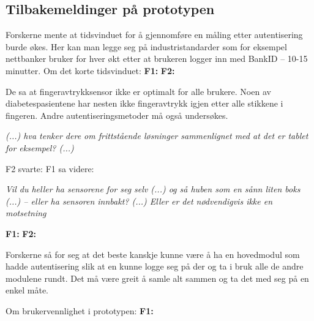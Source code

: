 \subsection{Tilbakemeldinger på prototypen}
Forskerne mente at tidsvinduet for å gjennomføre en måling etter autentisering burde økes. Her kan man legge seg på industristandarder
som for eksempel nettbanker bruker for hver økt etter at brukeren logger inn med BankID -- 10-15 minutter.
Om det korte tidsvinduet: \newline
\textbf{F1:}  \newline
\textbf{F2:} 

De sa at fingeravtrykksensor ikke er optimalt for alle brukere. Noen av diabetespasientene har nesten ikke fingeravtrykk igjen etter alle stikkene
i fingeren. Andre autentiseringsmetoder må også undersøkes.

\textit{(...) hva tenker dere om frittstående løsninger sammenlignet med at det er tablet for eksempel? (...)}

F2 svarte: 
F1 sa videre: 

\textit{Vil du heller ha sensorene for seg selv (...) og så huben som en sånn liten boks (...)  -- eller ha sensoren innbakt? (...)  Eller er det
nødvendigvis ikke en motsetning}

\textbf{F1:}  \newline
\textbf{F2:} 

Forskerne så for seg at det beste kanskje kunne være å ha en hovedmodul som hadde autentisering slik at en kunne logge seg på der
og ta i bruk alle de andre modulene rundt. Det må være greit å samle alt sammen og ta det med seg på en enkel måte.

Om brukervennlighet i prototypen:\newline
\textbf{F1:} 

